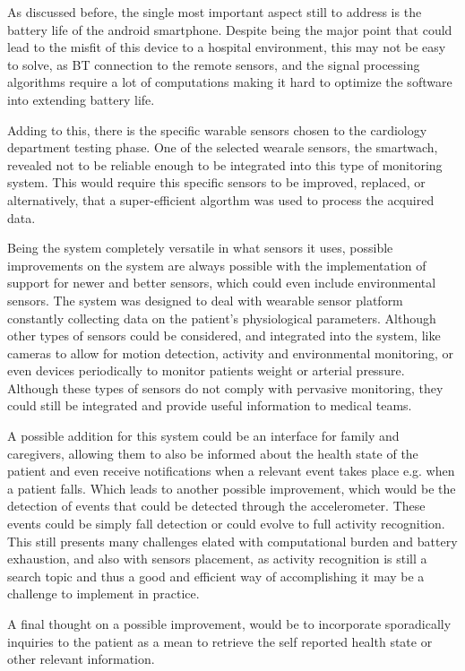 As discussed before, the single most important aspect still to address is the battery life of the android smartphone. Despite being the major point that could lead to the misfit of this device to a hospital environment, this may not be easy to solve, as BT connection to the remote sensors, and the signal processing algorithms require a lot of computations making it hard to optimize the software into extending battery life.

Adding to this, there is the specific warable sensors chosen to the cardiology department testing phase. One of the selected wearale sensors, the smartwach, revealed not to be reliable enough to be integrated into this type of monitoring system. This would require this specific sensors to be improved, replaced, or alternatively, that a super-efficient algorthm was used to process the acquired data.

Being the system completely versatile in what sensors it uses, possible improvements on the system are always possible with the implementation of support for newer and better sensors, which could even include environmental sensors. The system was designed to deal with wearable sensor platform constantly collecting data on the patient's physiological parameters. Although other types of sensors could be considered, and integrated into the system, like cameras to allow for motion detection, activity and environmental monitoring, or even devices periodically to monitor patients weight or arterial pressure. Although these types of sensors do not comply with pervasive monitoring, they could still be integrated and provide useful information to medical teams.

A possible addition for this system could be an interface for family and caregivers, allowing them to also be informed about the health state of the patient and even receive notifications when a relevant event takes place e.g. when a patient falls. Which leads to another possible improvement, which would be the detection of events that could be detected through the accelerometer. These events could be simply fall detection or could evolve to full activity recognition. This still presents many challenges elated with computational burden and battery exhaustion, and also with sensors placement, as activity recognition is still a search topic and thus a good and efficient way of accomplishing it may be a challenge to implement in practice.

A final thought on a possible improvement, would be to incorporate sporadically inquiries to the patient as a mean to retrieve the self reported health state or other relevant information.

